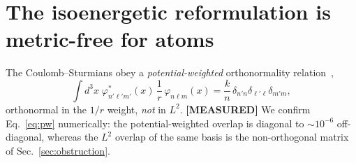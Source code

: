 \documentclass[aps,pra,twocolumn,superscriptaddress,longbibliography]{revtex4-2}
\begin{document}
\section{The isoenergetic reformulation is metric-free for atoms}
\label{sec:iso}

The Coulomb--Sturmians obey a \emph{potential-weighted} orthonormality
relation~\cite{averyphd,calderini2012,herbst2019},
\begin{equation}
\int d^3x\;\varphi^*_{n'\ell'm'}(x)\,\frac{1}{r}\,\varphi_{n\ell m}(x)
=\frac{k}{n}\,\delta_{n'n}\delta_{\ell'\ell}\delta_{m'm},
\label{eq:pw}
\end{equation}
orthonormal in the $1/r$ weight, \emph{not} in $L^2$.  \textbf{[MEASURED]} We
confirm Eq.~\eqref{eq:pw} numerically: the potential-weighted overlap is diagonal
to $\sim\!10^{-6}$ off-diagonal, whereas the $L^2$ overlap of the same basis is
the non-orthogonal matrix of Sec.~\ref{sec:obstruction}.
\end{document}
